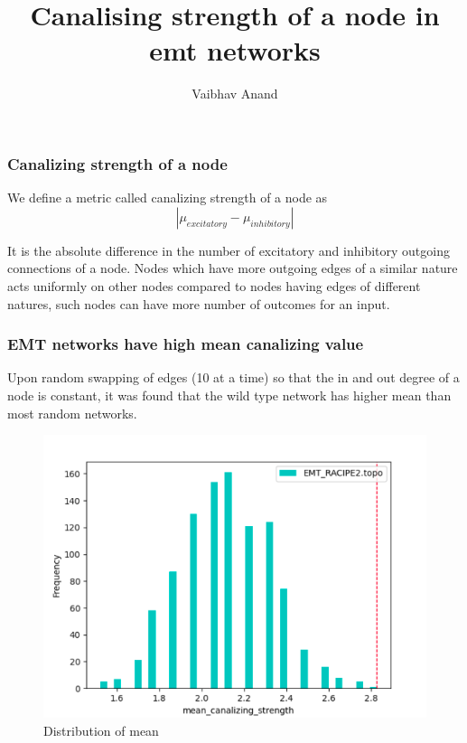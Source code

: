 \documentclass[t]{beamer}
\title{Canalising strength of a node in emt networks}
\author{Vaibhav Anand}
\begin{document}
\begin{frame}
\titlepage
\end{frame}


\begin{frame}
\frametitle{Canalizing strength of a node}

We define a metric called canalizing strength of a node as  \[  |\mu_{excitatory} - \mu_{inhibitory}|                    \]

It is the absolute difference in the number of excitatory and inhibitory outgoing connections of a node. Nodes which have more outgoing edges of a similar nature acts uniformly on other nodes compared to nodes having edges of different natures, such nodes can have more number of outcomes for an input.  
\end{frame}


\begin{frame}
	\frametitle{EMT networks have high mean canalizing value}

	Upon random swapping of edges (10 at a time) so that the in and out degree of a node is constant, it was found that the wild type network has higher mean than most random networks. 



\end{frame} 


\begin{frame}
	\begin{figure}[H]
	\includegraphics[scale=0.4]{img/emt_racipe_1.png}
	\caption{Distribution of mean}
	\end{figure}
\end{frame}
\end{document}
